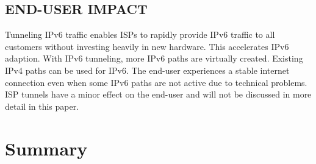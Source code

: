 \documentclass[format=sigconf, natbib=true, nonacm=true]{acmart}
\begin{document}
    \subsection*{END-USER IMPACT}
    Tunneling IPv6 traffic enables ISPs to rapidly provide IPv6 traffic to all customers without investing heavily in new hardware. This accelerates IPv6 adaption. With IPv6 tunneling, more IPv6 paths are virtually created. Existing IPv4 paths can be used for IPv6. The end-user experiences a stable internet connection even when some IPv6 paths are not active due to technical problems. ISP tunnels have a minor effect on the end-user and will not be discussed in more detail in this paper.

    \section{Summary}
\end{document}

